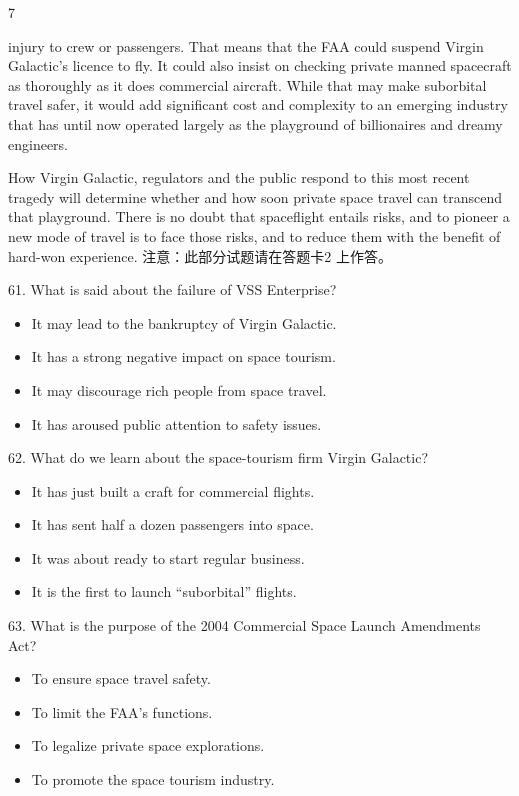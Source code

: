 \documentclass[UTF8,11pt]{ctexart}
\begin{document}
7


injury to crew or passengers. That means that the FAA could suspend Virgin Galactic’s licence to fly. It could also insist on checking private manned spacecraft as thoroughly as it does commercial aircraft. While that may make suborbital travel safer, it would add significant cost and complexity to an emerging industry that has until now operated largely as the playground of billionaires and dreamy engineers.


How Virgin Galactic, regulators and the public respond to this most recent tragedy will determine whether and how soon private space travel can transcend that playground. There is no doubt that spaceflight entails risks, and to pioneer a new mode of travel is to face those risks, and to reduce them with the benefit of hard-won experience. 注意：此部分试题请在答题卡2 上作答。


61. What is said about the failure of VSS Enterprise?


\begin{itemize}[leftmargin=2em,itemsep=.2em,topsep=.4em]\item[A.] It may lead to the bankruptcy of Virgin Galactic.
\item[B.] It has a strong negative impact on space tourism.
\item[C.] It may discourage rich people from space travel.
\item[D.] It has aroused public attention to safety issues.
\end{itemize}

62. What do we learn about the space-tourism firm Virgin Galactic?


\begin{itemize}[leftmargin=2em,itemsep=.2em,topsep=.4em]\item[A.] It has just built a craft for commercial flights.
\item[B.] It has sent half a dozen passengers into space.
\item[C.] It was about ready to start regular business.
\item[D.] It is the first to launch “suborbital” flights.
\end{itemize}

63. What is the purpose of the 2004 Commercial Space Launch Amendments Act?


\begin{itemize}[leftmargin=2em,itemsep=.2em,topsep=.4em]\item[A.] To ensure space travel safety.
\item[B.] To limit the FAA’s functions.
\item[C.] To legalize private space explorations.
\item[D.] To promote the space tourism industry.
\end{itemize}
\end{document}
